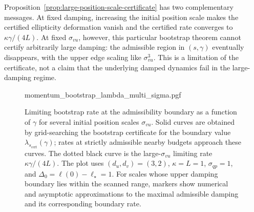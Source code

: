 Proposition~\ref{prop:large-position-scale-certificate} has two complementary
messages.  At fixed damping, increasing the initial position scale makes the
certified ellipticity deformation vanish and the certified rate converges to
\(\kappa\gamma/(4L)\).  At fixed \(\sigma_{vu}\), however, this
particular bootstrap theorem cannot certify arbitrarily large damping: the
admissible region in \((s,\gamma)\) eventually disappears, with the upper
edge scaling like \(\sigma_{vu}^3\).  This is a limitation of the certificate,
not a claim that the underlying damped dynamics fail in the large-damping
regime.

\begin{figure}[t]
  \centering
  \def\mathdefault#1{#1}
  {momentum_bootstrap_lambda_multi_sigma.pgf}
\caption{
Limiting bootstrap rate at the admissibility boundary as a function of $\gamma$ for several initial position
scales $\sigma_{vu}$.
Solid curves are obtained by grid-searching the bootstrap certificate
for the boundary value \(\lambda_{s_{\mathrm{cert}}}(\gamma)\); rates at
strictly admissible nearby budgets approach these curves.  The dotted black curve is
the large-\(\sigma_{vu}\) limiting rate \(\kappa\gamma/(4L)\).  The
plot uses \((d_u, d_v) = (3, 2)\), \(\kappa=L=1\), \(\sigma_{qp}=1\), and
\(\Delta_0=\ell(0)-\ell_\star=1\).
For scales whose upper damping boundary lies within the scanned range, markers show numerical and asymptotic approximations to the maximal admissible damping and its corresponding boundary rate.
}
\label{fig:momentum-bootstrap-lambda-multi-sigma}\label{fig:momentum-boundary}
\end{figure}

\FloatBarrier

